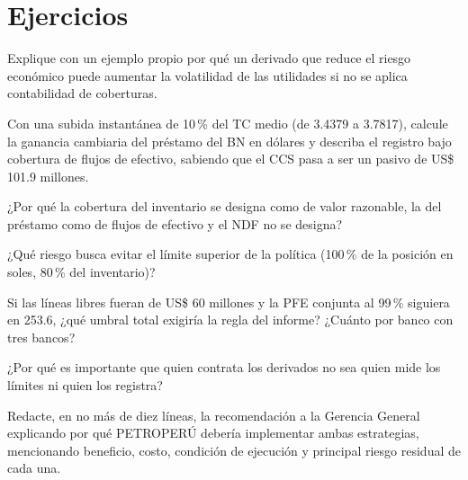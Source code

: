 \section*{Ejercicios}

\ejercicio[conceptual] Explique con un ejemplo propio por qué un derivado que reduce el riesgo económico puede aumentar la volatilidad de las utilidades si no se aplica contabilidad de coberturas.

\ejercicio[cálculo] Con una subida instantánea de 10\,\% del TC medio (de 3.4379 a 3.7817), calcule la ganancia cambiaria del préstamo del BN en dólares y describa el registro bajo cobertura de flujos de efectivo, sabiendo que el CCS pasa a ser un pasivo de US\$ 101.9 millones.

\ejercicio[conceptual] ¿Por qué la cobertura del inventario se designa como de valor razonable, la del préstamo como de flujos de efectivo y el NDF no se designa?

\ejercicio[conceptual] ¿Qué riesgo busca evitar el límite superior de la política (100\,\% de la posición en soles, 80\,\% del inventario)?

\ejercicio[cálculo] Si las líneas libres fueran de US\$ 60 millones y la PFE conjunta al 99\,\% siguiera en 253.6, ¿qué umbral total exigiría la regla del informe? ¿Cuánto por banco con tres bancos?

\ejercicio[conceptual] ¿Por qué es importante que quien contrata los derivados no sea quien mide los límites ni quien los registra?

\ejercicio[integrador] Redacte, en no más de diez líneas, la recomendación a la Gerencia General explicando por qué PETROPERÚ debería implementar ambas estrategias, mencionando beneficio, costo, condición de ejecución y principal riesgo residual de cada una.
